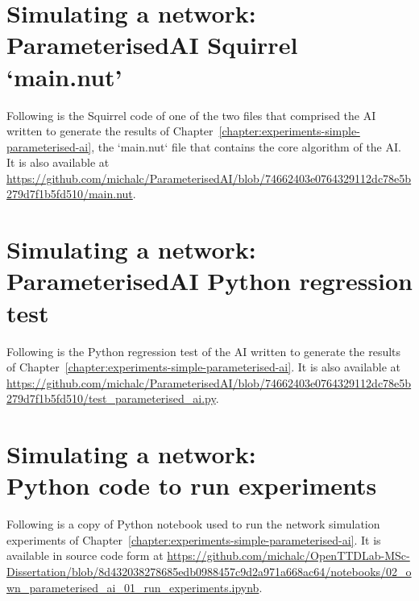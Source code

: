 \documentclass[logo,msc,dsti]{style/infthesis}    %
\begin{document}
{

\chapter[Simulating a network: ParameterisedAI Squirrel `main.nut']{Simulating a network:\texorpdfstring{\\}{ }ParameterisedAI Squirrel `main.nut'}
\label{chapter:simulating-a-network-squirrel-main}

Following is the Squirrel code of one of the two files that comprised the AI written to generate the results of Chapter~\ref{chapter:experiments-simple-parameterised-ai}, the `main.nut` file that contains the core algorithm of the AI. It is also available at \url{https://github.com/michalc/ParameterisedAI/blob/74662403e0764329112dc78e5b279d7f1b5fd510/main.nut}.



\chapter[Simulating a network: ParameterisedAI Python regression test]{Simulating a network:\texorpdfstring{\\}{ }ParameterisedAI Python regression test}
\label{chapter:simulating-a-network-python-regression-test}

Following is the Python regression test of the AI written to generate the results of Chapter~\ref{chapter:experiments-simple-parameterised-ai}. It is also available at \url{https://github.com/michalc/ParameterisedAI/blob/74662403e0764329112dc78e5b279d7f1b5fd510/test_parameterised_ai.py}.



\chapter[Simulating a network: Python code to run experiments]{Simulating a network:\texorpdfstring{\\}{ }Python code to run experiments}
\label{chapter:own-parameterised-ai-run-experiments}

Following is a copy of Python notebook used to run the network simulation experiments of Chapter~\ref{chapter:experiments-simple-parameterised-ai}. It is available in source code form at \url{https://github.com/michalc/OpenTTDLab-MSc-Dissertation/blob/8d432038278685edb0988457c9d2a971a668ac64/notebooks/02_own_parameterised_ai_01_run_experiments.ipynb}.

}
\end{document}
